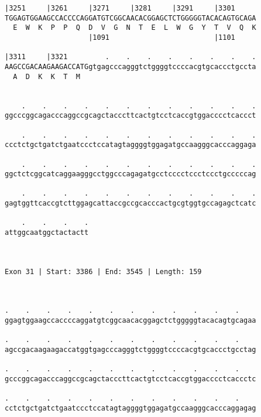 \documentclass{article}
\begin{document}
\begin{Verbatim}
|3251     |3261     |3271     |3281     |3291     |3301     
TGGAGTGGAAGCCACCCCAGGATGTCGGCAACACGGAGCTCTGGGGGTACACAGTGCAGA
  E  W  K  P  P  Q  D  V  G  N  T  E  L  W  G  Y  T  V  Q  K
                    |1091                         |1101     
  
|3311     |3321         .    .    .    .    .    .    .    .
AAGCCGACAAGAAGACCATGgtgagcccagggtctggggtccccacgtgcaccctgccta
  A  D  K  K  T  M                                          
                                                            
  
    .    .    .    .    .    .    .    .    .    .    .    .
ggcccggcagacccaggccgcagctacccttcactgtcctcaccgtggacccctcaccct
                                                            
    .    .    .    .    .    .    .    .    .    .    .    .
ccctctgctgatctgaatccctccatagtaggggtggagatgccaagggcacccaggaga
                                                            
    .    .    .    .    .    .    .    .    .    .    .    .
ggctctcggcatcaggaagggcctggcccagagatgcctcccctccctccctgcccccag
                                                            
    .    .    .    .    .    .    .    .    .    .    .    .
gagtggttcaccgtcttggagcattaccgccgcacccactgcgtggtgccagagctcatc
                                                            
    .    .    .    .
attggcaatggctactactt
                    
                    
 
Exon 31 | Start: 3386 | End: 3545 | Length: 159



.    .    .    .    .    .    .    .    .    .    .    .    
ggagtggaagccaccccaggatgtcggcaacacggagctctgggggtacacagtgcagaa
                                                            
.    .    .    .    .    .    .    .    .    .    .    .    
agccgacaagaagaccatggtgagcccagggtctggggtccccacgtgcaccctgcctag
                                                            
.    .    .    .    .    .    .    .    .    .    .    .    
gcccggcagacccaggccgcagctacccttcactgtcctcaccgtggacccctcaccctc
                                                            
.    .    .    .    .    .    .    .    .    .    .    .    
cctctgctgatctgaatccctccatagtaggggtggagatgccaagggcacccaggagag
                                                            

\end{Verbatim}
\end{document}
